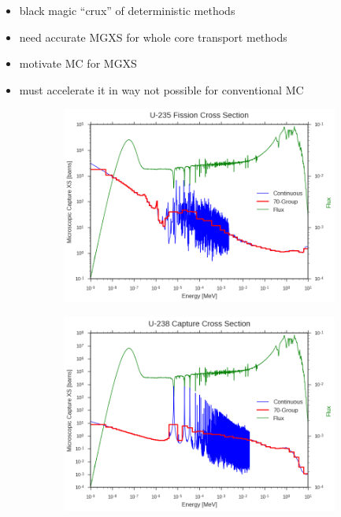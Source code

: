 \begin{itemize}[noitemsep]
  \item black magic ``crux'' of deterministic methods
  \item need accurate \ac{MGXS} for whole core transport methods
  \item motivate \ac{MC} for \ac{MGXS}
  \item must accelerate it in way not possible for conventional \ac{MC}
\end{itemize}

\begin{figure}
\begin{subfigure}{.5\textwidth}
  \centering
  \includegraphics[width=\linewidth]{figures/intro/u235-fission-70}
  \caption{}
\end{subfigure}%
\begin{subfigure}{.5\textwidth}
  \centering
  \includegraphics[width=\linewidth]{figures/intro/u238-capture-70}

\end{subfigure}
\end{figure}
